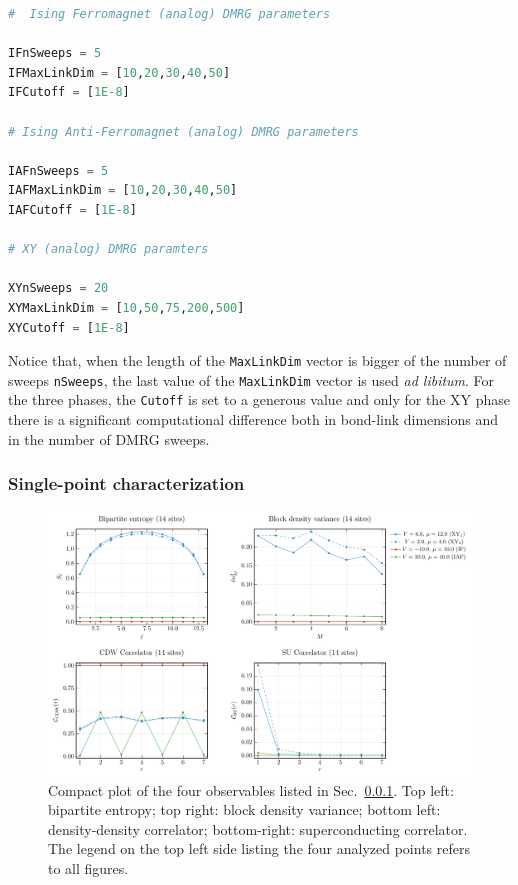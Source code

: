 \begin{lstlisting}[language=julia]
#  Ising Ferromagnet (analog) DMRG parameters

IFnSweeps = 5
IFMaxLinkDim = [10,20,30,40,50]
IFCutoff = [1E-8]

# Ising Anti-Ferromagnet (analog) DMRG parameters

IAFnSweeps = 5
IAFMaxLinkDim = [10,20,30,40,50]
IAFCutoff = [1E-8]

# XY (analog) DMRG paramters

XYnSweeps = 20
XYMaxLinkDim = [10,50,75,200,500]
XYCutoff = [1E-8]
\end{lstlisting}

\noindent Notice that, when the length of the \texttt{MaxLinkDim} vector is bigger of the number of sweeps \texttt{nSweeps}, the last value of the \texttt{MaxLinkDim} vector is used \textit{ad libitum}. For the three phases, the \texttt{Cutoff} is set to a generous value and only for the $\mathrm{XY}$ phase there is a significant computational difference both in bond-link dimensions and in the number of DMRG sweeps. 

\subsubsection{Single-point characterization}\label{subsubsec:single-point-characterization}

\begin{figure}
	\centering
	\includegraphics[width=\textwidth]{../Project/analysis/states-properties/compact-plot_L=14.pdf}
	\caption{Compact plot of the four observables listed in Sec.~\ref{subsubsec:single-point-characterization}. Top left: bipartite entropy; top right: block density variance; bottom left: density-density correlator; bottom-right: superconducting correlator. The legend on the top left side listing the four analyzed points refers to all figures.}
	\label{fig:compact-plot}
\end{figure}

